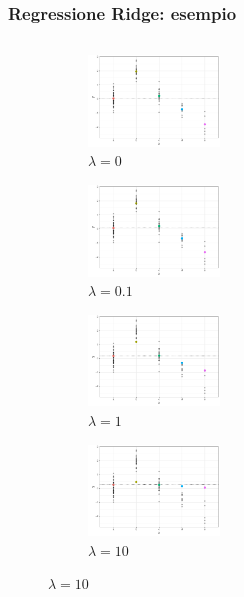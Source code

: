 \documentclass[pdf, aspectratio=169]{beamer}\usepackage[]{graphicx}\usepackage[]{color}
\theoremstyle{definition}
\begin{document}
\begin{frame}
\frametitle{Regressione Ridge: esempio}

\fontsize{9pt}{11pt}\selectfont

\begin{columns}[c]
\begin{column}{0.55\linewidth}
  \begin{figure}
    \centering
    \begin{subfigure}[b]{3cm}
      \centering
      \caption{$\lambda = 0$}
      \includegraphics[width=3.5cm]{_bookdown_files/_main_files/figure-latex/ridge-lambda-1.pdf}
    \end{subfigure}
    \qquad
    \begin{subfigure}[b]{3cm}
      \centering
      \caption{$\lambda = 0.1$}
      \includegraphics[width=3.5cm]{_bookdown_files/_main_files/figure-latex/ridge-lambda-2.pdf}
    \end{subfigure}
    \par\medskip
    \begin{subfigure}[b]{3cm}
      \centering
      \caption{$\lambda = 1$}
      \includegraphics[width=3.5cm]{_bookdown_files/_main_files/figure-latex/ridge-lambda-3.pdf}
    \end{subfigure}
    \qquad
    \begin{subfigure}[b]{3cm}
      \centering
      \caption{$\lambda = 10$}
      \includegraphics[width=3.5cm]{_bookdown_files/_main_files/figure-latex/ridge-lambda-4.pdf}

\end{subfigure}
\end{figure}
\end{column}
\end{columns}
\end{frame}
\end{document}
